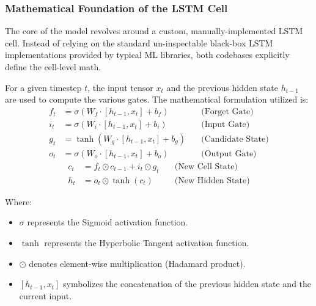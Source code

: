 \documentclass[10pt,a4paper,twocolumn]{article}
\begin{document}
\subsubsection{Mathematical Foundation of the LSTM Cell}
The core of the model revolves around a custom, manually-implemented LSTM cell. Instead of relying on the standard un-inspectable black-box LSTM implementations provided by typical ML libraries, both codebases explicitly define the cell-level math. 

For a given timestep $t$, the input tensor $x_t$ and the previous hidden state $h_{t-1}$ are used to compute the various gates. The mathematical formulation utilized is:
\begin{align}
    f_t &= \sigma(W_f \cdot [h_{t-1}, x_t] + b_f) \quad &\text{(Forget Gate)} \\
    i_t &= \sigma(W_i \cdot [h_{t-1}, x_t] + b_i) \quad &\text{(Input Gate)} \\
    g_t &= \tanh(W_g \cdot [h_{t-1}, x_t] + b_g) \quad &\text{(Candidate State)} \\
    o_t &= \sigma(W_o \cdot [h_{t-1}, x_t] + b_o) \quad &\text{(Output Gate)}
\end{align}
\begin{align}
    c_t &= f_t \odot c_{t-1} + i_t \odot g_t \quad &\text{(New Cell State)} \\
    h_t &= o_t \odot \tanh(c_t) \quad &\text{(New Hidden State)}
\end{align}

Where:
\begin{itemize}
    \item $\sigma$ represents the Sigmoid activation function.
    \item $\tanh$ represents the Hyperbolic Tangent activation function.
    \item $\odot$ denotes element-wise multiplication (Hadamard product).
    \item $[h_{t-1}, x_t]$ symbolizes the concatenation of the previous hidden state and the current input.
\end{itemize}
\end{document}
